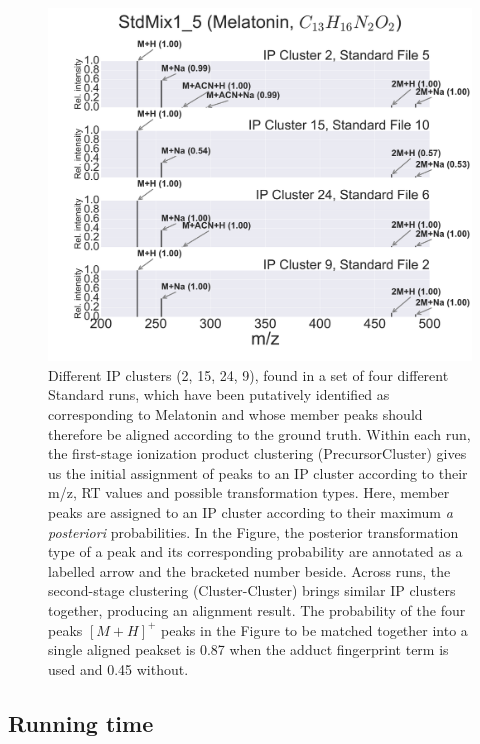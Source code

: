 \begin{figure}
\centering
\includegraphics[width=1.0\linewidth]{05-precursor-cluster/figures/melatonin.pdf}
\caption{\label{fig:06} Different IP clusters (2, 15, 24, 9), found in a set of four different Standard runs, which have been putatively identified as corresponding to Melatonin and whose member peaks should therefore be aligned according to the ground truth. Within each run, the first-stage ionization product clustering (PrecursorCluster) gives us the initial assignment of peaks to an IP cluster according to their m/z, RT values and possible transformation types. Here, member peaks are assigned to an IP cluster according to their maximum \textit{a posteriori} probabilities. In the Figure, the posterior transformation type of a peak and its corresponding probability are annotated as a labelled arrow and the bracketed number beside. Across runs, the second-stage clustering (Cluster-Cluster) brings similar IP clusters together, producing an alignment result. The probability of the four peaks $[M+H]^+$ peaks in the Figure to be matched together into a single aligned peakset is 0.87 when the adduct fingerprint term is used and 0.45 without. }
\end{figure}


\subsection{Running time}

